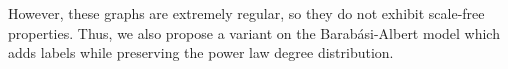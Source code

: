 








However, these graphs are extremely regular, so they do not exhibit scale-free properties. Thus, we
also propose a variant on the Barab\'asi-Albert model which adds labels while preserving the power
law degree distribution.



